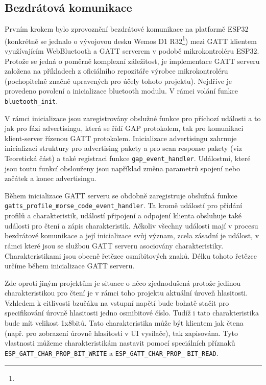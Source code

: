 \documentclass[10pt]{article}
\begin{document}
\subsection{Bezdrátová komunikace}
\par Prvním krokem bylo zprovoznění bezdrátové komunikace na platformě ESP32 (konkrétně se jednalo o vývojovou desku Wemos D1 R32\footnote{}) mezi GATT klientem využívajícím WebBluetooth a GATT serverem v podobě mikrokontroléru ESP32. Protože se jedná o poměrně komplexní záležitost, je implementace GATT serveru založena na příkladech z oficiálního repozitáře výrobce mikrokontroléru (pochopitelně značně upravených pro účely tohoto projektu). Nejdříve je provedeno povolení a inicializace bluetooth modulu. V rámci volání funkce \verb|bluetooth_init|.
\par V rámci inicializace jsou zaregistrovány obslužné funkce pro příchozí události a to jak pro fázi advertisingu, která se řídí GAP protokolem, tak pro komunikaci klient-server řízenou GATT protokolem.
Inicializace advertisingu zahrnuje inicializaci struktury pro advertising pakety a pro scan response pakety (viz Teoretická část) a také registraci funkce \verb|gap_event_handler|. Událostmi, které jsou toutu funkcí obslouženy jsou například změna parametrů spojení nebo začátek a konec advertisingu.
\par Během inicializace GATT serveru se obdobně zaregistruje obslužná funkce\\
\verb|gatts_profile_morse_code_event_handler|. Ta kromě událostí pro přidání profilů a charakteristik, událostí připojení a odpojení klienta obsluhuje také události pro čtení a zápis charakteristik.
Ačkoliv všechny události mají v procesu bezdrátové komunikace a její inicializace svůj význam, zcela zásadní je událost, v rámci které jsou se službou GATT serveru asociovány charakteristiky. Charakteristikami jsou obecně řetězce osmibitových znaků. Délku tohoto řetězce určíme během inicializace GATT serveru. 
\par Zde oproti jiným projektům je situace o něco zjednodušená protože jedinou charakteristikou pro čtení je v rámci toho projektu aktuální úroveň hlasitosti. Vzhledem k citlivosti bzučáku na vstupní napětí bude bohatě stačit pro specifikování úrovně hlasitosti jedno osmibitové číslo. Tudíž i tato charakteristika bude mít velikost 1x8bitů. Tato charakteristika může být klientem jak čtena (např. pro zobrazení úrovně hlasitosti v UI vysílače), tak zapisována. Tyto vlastnosti můžeme charakteristikám nastavit pomocí speciálních příznaků \verb|ESP_GATT_CHAR_PROP_BIT_WRITE| a \verb|ESP_GATT_CHAR_PROP_| \verb|BIT_READ|.
\end{document}
